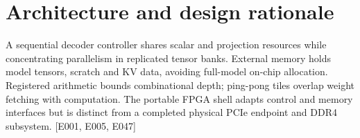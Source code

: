 \documentclass[11pt,a4paper]{article}
\begin{document}
\section{Architecture and design rationale}

A sequential decoder controller shares scalar and projection resources while concentrating parallelism in replicated tensor banks. External memory holds model tensors,\allowbreak{} scratch and KV data,\allowbreak{} avoiding full-model on-chip allocation. Registered arithmetic bounds combinational depth; ping-pong tiles overlap weight fetching with computation. The portable FPGA shell adapts control and memory interfaces but is distinct from a completed physical PCIe endpoint and DDR4 subsystem. [\allowbreak{}E001,\allowbreak{} E005,\allowbreak{} E047]\allowbreak{}
\end{document}
